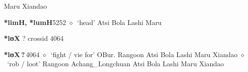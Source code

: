 \begin{list}{}{\leftmargin=1.5em \itemindent=-1.5em}
\hspace{1ex}
         Maru 
\hspace{1ex}
         Xiandao 
  \item {\footnotesize \textbf{*limH, *lumH}}{\tiny 5252}
\hspace{1ex}
         $\diamond$~`head'
         Atsi 
\hspace{1ex}
         Bola 
\hspace{1ex}
         Lashi 
\hspace{1ex}
         Maru 
  \end{list}
\item
\textbf{*lʊX}
?
  {\tiny crossid 4064}
  \begin{list}{}{\leftmargin=1.5em \itemindent=-1.5em}
  \item {\footnotesize \textbf{*lʊX\,?\,}}{\tiny 4064}
         $\diamond$~`fight / vie for'
         OBur. 
\hspace{1ex}
         Rangoon 
\hspace{1ex}
         Atsi 
\hspace{1ex}
         Bola 
\hspace{1ex}
         Lashi 
\hspace{1ex}
         Maru 
\hspace{1ex}
         Xiandao 
\hspace{1ex}
         $\diamond$~`rob / loot'
         Rangoon 
\hspace{1ex}
         Achang\_Longchuan 
\hspace{1ex}
         Atsi 
\hspace{1ex}
         Bola 
\hspace{1ex}
         Lashi 
\hspace{1ex}
         Maru 
\hspace{1ex}
         Xiandao 
  \end{list}
